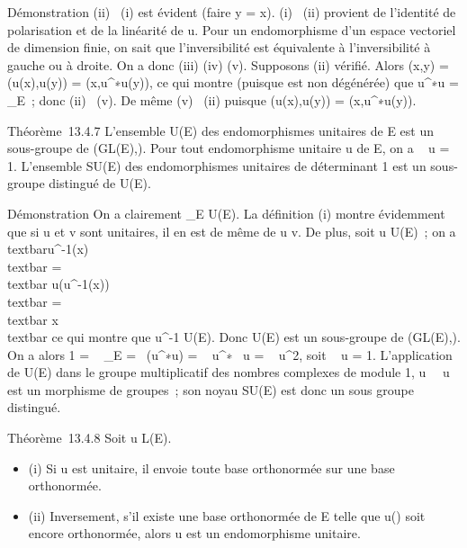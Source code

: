 \documentclass[]{article}
\begin{document}
Démonstration (ii) \rigtharrow~(i) est évident (faire y = x). (i) \rigtharrow~(ii) provient de
l'identité de polarisation et de la linéarité de u. Pour un
endomorphisme d'un espace vectoriel de dimension finie, on sait que
l'inversibilité est équivalente à l'inversibilité à gauche ou à droite.
On a donc (iii) \Leftrightarrow (iv)
\Leftrightarrow (v). Supposons (ii) vérifié. Alors \phi(x,y) =
\phi(u(x),u(y)) = \phi(x,u^∗\cdot u(y)), ce qui montre (puisque \phi est
non dégénérée) que u^∗\cdot u =
\mathrmId\_E~; donc (ii) \rigtharrow~(v). De même (v)
\rigtharrow~(ii) puisque \phi(u(x),u(y)) = \phi(x,u^∗\cdot u(y)).

Théorème~13.4.7 L'ensemble U(E) des endomorphismes unitaires de E est un
sous-groupe de (GL(E),\cdot). Pour tout endomorphisme unitaire u de E, on a
\textbar{}~
u\textbar{} = 1. L'ensemble SU(E) des endomorphismes unitaires de
déterminant 1 est un sous-groupe distingué de U(E).

Démonstration On a clairement \mathrmId\_E \in
U(E). La définition (i) montre évidemment que si u et v sont unitaires,
il en est de même de u \cdot v. De plus, soit u \in U(E)~; on a
\\textbar{}u^-1(x)\\textbar{}
=\\textbar{}
u(u^-1(x))\\textbar{}
=\\textbar{} x\\textbar{} ce qui montre
que u^-1 \in U(E). Donc U(E) est un sous-groupe de (GL(E),\cdot).
On a alors 1 = ~
\mathrmId\_E =\
 (u^∗\cdot u)
= ~
u^∗\mathrm{det}~ u
= \textbar{}~
u\textbar{}^2, soit
\textbar{}~
u\textbar{} = 1. L'application de U(E) dans le groupe multiplicatif des
nombres complexes de module 1,
u\mapsto~~
u est un morphisme de groupes~; son noyau SU(E) est donc un sous groupe
distingué.

Théorème~13.4.8 Soit u \in L(E).

\begin{itemize}
\itemsep1pt\parskip0pt
\item
  (i) Si u est unitaire, il envoie toute base orthonormée sur une base
  orthonormée.
\item
  (ii) Inversement, s'il existe une base orthonormée  de E telle que
  u(\mathcal{E}) soit encore orthonormée, alors u est un endomorphisme unitaire.
\end{itemize}
\end{document}
